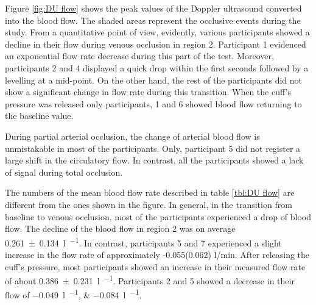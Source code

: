 Figure \ref{fig:DU flow} shows the peak values of the Doppler ultrasound converted into the blood flow. The shaded areas represent the occlusive events during the study. From a quantitative point of view, evidently, various participants showed a decline in their flow during venous occlusion in region 2.  Participant 1 evidenced an exponential flow rate decrease during this part of the test. Moreover, participants 2 and 4 displayed a quick drop within the first seconds followed by a levelling at a mid-point. On the other hand, the rest of the participants did not show a significant change in flow rate during this transition. When the cuff's pressure was released only participants, 1 and 6 showed blood flow returning to the baseline value.  

During partial arterial occlusion, the change of arterial blood flow is unmistakable in most of the participants. Only, participant 5 did not register a large shift in the circulatory flow. In contrast, all the participants showed a lack of signal during total occlusion. 

The numbers of the mean blood flow rate described in table \ref{tbl:DU flow} are different from the ones shown in the figure. In general, in the transition from baseline to venous occlusion, most of the participants experienced a drop of blood flow. The decline of the blood flow in region 2 was on average \SI{0.261(0134)}{\litre\per\min}. In contrast, participants 5 and 7 experienced a slight increase in the flow rate of approximately -0.055(0.062) l/min. After releasing the cuff's pressure, most participants showed an increase in their measured flow rate of about \SI{0.386(0231)}{\litre\per\min}. Participants 2 and  5 showed a decrease in their flow of \SIlist{-0.049;-0.084}{\litre\per\min}. 


